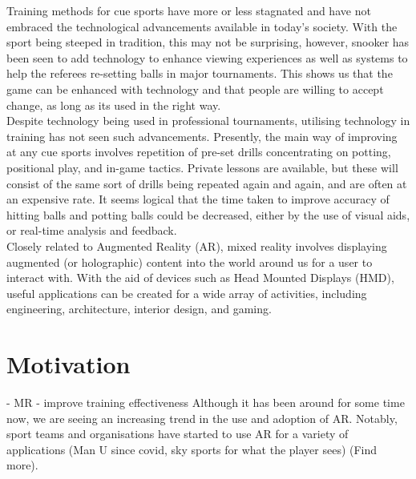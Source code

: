 \documentclass[ %
                author={Finn Alexander Wilkinson},
                supervisor={Dr. Andrew Calway},
                degree={MEng},
                title={\centering A Mixed Reality Aim Assistant for Pool and Snooker},
                subtitle={},
                type={Enterprise},
                year={2021} ]{dissertation}
\begin{document}
Training methods for cue sports have more or less stagnated and have not embraced the technological advancements available in today's society. With the sport being steeped in tradition, this may not be surprising, however, snooker has been seen to add technology to enhance viewing experiences\cite{hawkEye} as well as systems to help the referees re-setting balls in major tournaments\cite{snookerBallSetting}. This shows us that the game can be enhanced with technology and that people are willing to accept change, as long as its used in the right way. \\
Despite technology being used in professional tournaments, utilising technology in training has not seen such advancements. Presently, the main way of improving at any cue sports involves repetition of pre-set drills concentrating on potting, positional play, and in-game tactics. Private lessons are available, but these will consist of the same sort of drills being repeated again and again, and are often at an expensive rate.
It seems logical that the time taken to improve accuracy of hitting balls and potting balls could be decreased, either by the use of visual aids, or real-time analysis and feedback.\\
\newline
Closely related to Augmented Reality (AR), mixed reality involves displaying augmented (or holographic) content into the world around us for a user to interact with. With the aid of devices such as Head Mounted Displays (HMD), useful applications can be created for a wide array of activities, including engineering, architecture, interior design, and gaming.  

\section{Motivation}
 - MR
 - improve training effectiveness
Although it has been around for some time now, we are seeing an increasing trend in the use and adoption of AR. Notably, sport teams and organisations have started to use AR for a variety of applications (Man U since covid, sky sports for what the player sees) (Find more). 
\end{document}

